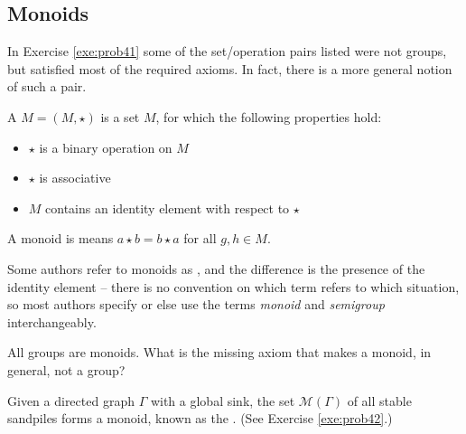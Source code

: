 \documentclass[../algebraNotesMSRI-UP2016.tex]{subfiles}
\begin{document}

\subsection[\subsecname]{Monoids}\label{subsec:monoids}
\begin{frame}{\subsecname}
In Exercise \ref{exe:prob41} some of the set/operation pairs listed were not groups, but satisfied most of the required axioms.  In fact, there is a more general notion of such a pair.

\smallGap
\begin{dfn}
A  $M=(M,\star)$ is a set $M$, for which the following properties hold:
\begin{itemize}
\item $\star$ is a binary operation on $M$
\item $\star$ is associative
\item $M$ contains an identity element with respect to $\star$
\end{itemize}

\smallGap
A monoid is  means $a\star b=b\star a$ for all $g,h\in M$.
\end{dfn}
\end{frame}

\begin{frame}%
Some authors refer to monoids as , and the difference is the presence of the identity element -- there is no convention on which term refers to which situation, so most authors specify or else use the terms \emph{monoid} and \emph{semigroup} interchangeably.

\smallGap
\begin{que}
All groups are monoids.  What is the missing axiom that makes a monoid, in general, not a group?
\end{que}

\smallGap
\begin{ex}
Given a directed graph $\Gamma$ with a global sink, the set $\mathscr M(\Gamma)$ of all stable sandpiles forms a monoid, known as the .  (See Exercise \ref{exe:prob42}.)
\end{ex}
\end{frame}
\end{document}
